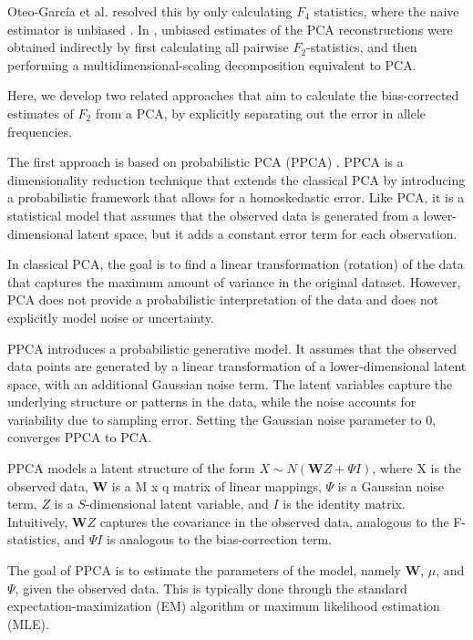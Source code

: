 \documentclass[12pt, letterpaper]{article}
\begin{document}
Oteo-García et al. resolved this by only calculating $F_4$ statistics, where the naive estimator is unbiased \cite{oteo-garcia_geometrical_2021}. In \cite{peter_geometric_2022}, unbiased estimates of the PCA reconstructions were obtained indirectly by first calculating all pairwise $F_2$-statistics, and then performing a multidimensional-scaling decomposition equivalent to PCA. 

Here, we develop two related approaches that aim to calculate the bias-corrected estimates of $F_2$ from a PCA, by explicitly separating out the error in allele frequencies.

The first approach is based on probabilistic PCA (PPCA) \cite{tipping_probabilistic_nodate, agrawal_scalable_2020}.
PPCA is a dimensionality reduction technique that extends the classical PCA by introducing a probabilistic framework that allows for a homoskedastic error. Like PCA, it is a statistical model that assumes that the observed data is generated from a lower-dimensional latent space, but it adds a constant error term for each observation.

In classical PCA, the goal is to find a linear transformation (rotation) of the data that captures the maximum amount of variance in the original dataset. However, PCA does not provide a probabilistic interpretation of the data and does not explicitly model noise or uncertainty.

PPCA introduces a probabilistic generative model. It assumes that the observed data points are generated by a linear transformation of a lower-dimensional latent space, with an additional Gaussian noise term. The latent variables capture the underlying structure or patterns in the data, while the noise accounts for variability due to sampling error. Setting the Gaussian noise parameter to 0, converges PPCA to PCA.

PPCA models a latent structure of the form $X \sim N(\mathbf{W}Z + \Psi I)$, where X is the observed data, $\mathbf{W}$ is a M x q matrix of linear mappings, $\Psi$ is a Gaussian noise term, $Z$ is a $S$-dimensional latent variable, and $I$ is the identity matrix. Intuitively, $\mathbf{W}Z$ captures the covariance in the observed data, analogous to the F-statistics, and $\Psi I$ is analogous to the bias-correction term.

The goal of PPCA is to estimate the parameters of the model, namely $\mathbf{W}$, $\mu$, and $\Psi$, given the observed data. This is typically done through the standard expectation-maximization (EM) algorithm or maximum likelihood estimation (MLE).
\end{document}

